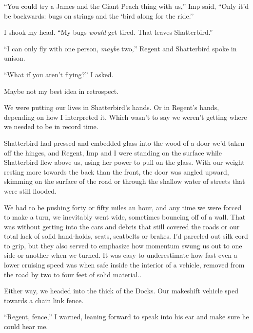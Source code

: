 ``You could try a James and the Giant Peach thing with us,'' Imp said, ``Only it'd be backwards: bugs on strings and the `bird along for the ride.''



I shook my head.  ``My bugs \emph{would} get tired.  That leaves Shatterbird.''



``I can only fly with one person, \emph{maybe} two,'' Regent and Shatterbird spoke in unison.



``What if you aren't flying?''  I asked.



\blacksquare



Maybe not my best idea in retrospect.



We were putting our lives in Shatterbird's hands.  Or in Regent's hands, depending on how I interpreted it.  Which wasn't to say we weren't getting where we needed to be in record time.



Shatterbird had pressed and embedded glass into the wood of a door we'd taken off the hinges, and Regent, Imp and I were standing on the surface while Shatterbird flew above us, using her power to pull on the glass.  With our weight resting more towards the back than the front, the door was angled upward, skimming on the surface of the road or through the shallow water of streets that were still flooded.



We had to be pushing forty or fifty miles an hour, and any time we were forced to make a turn, we inevitably went wide, sometimes bouncing off of a wall.  That was without getting into the cars and debris that still covered the roads or our total lack of solid hand-holds, seats, seatbelts or brakes.  I'd parceled out silk cord to grip, but they also served to emphasize how momentum swung us out to one side or another when we turned.  It was easy to underestimate how fast even a lower cruising speed was when safe inside the interior of a vehicle, removed from the road by two to four feet of solid material..



Either way, we headed into the thick of the Docks.  Our makeshift vehicle sped towards a chain link fence.



``Regent, fence,'' I warned, leaning forward to speak into his ear and make sure he could hear me.



